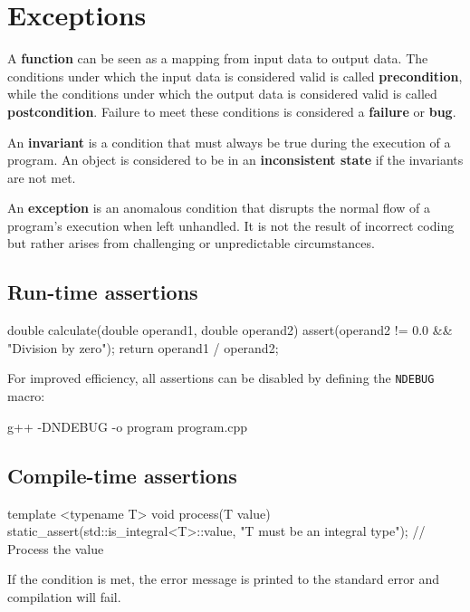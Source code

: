 \section{Exceptions}

A \textbf{function} can be seen as a mapping from input data to output data. 
The conditions under which the input data is considered valid is called \textbf{precondition}, 
while the conditions under which the output data is considered valid is called \textbf{postcondition}.
Failure to meet these conditions is considered a \textbf{failure} or \textbf{bug}.

An \textbf{invariant} is a condition that must always be true during the execution of a program.
    An object is considered to be in an \textbf{inconsistent state} if the invariants are not met.

\begin{definitionblock}[Exception]
    An \textbf{exception} is an anomalous condition that disrupts the normal flow of a program's execution
    when left unhandled. It is not the result of incorrect coding but rather arises from challenging or
    unpredictable circumstances.
\end{definitionblock}


\subsection{Run-time assertions}

\begin{exampleblock}
    \begin{codeblock}[language=C++]
double calculate(double operand1, double operand2) {
    assert(operand2 != 0.0 && "Division by zero");
    return operand1 / operand2;
}
    \end{codeblock}
\end{exampleblock}

For improved efficiency, all assertions can be disabled by defining the \texttt{NDEBUG} macro:
\begin{codeblock}[language=bash]
    g++ -DNDEBUG -o program program.cpp
\end{codeblock}


\subsection{Compile-time assertions}

\begin{exampleblock}
    \begin{codeblock}[language=C++]
template <typename T>
void process(T value) {
    static_assert(std::is_integral<T>::value, "T must be an integral type");
    // Process the value
}
    \end{codeblock}
\end{exampleblock}
If the condition is met, the error message is printed to the standard error and compilation will fail.


